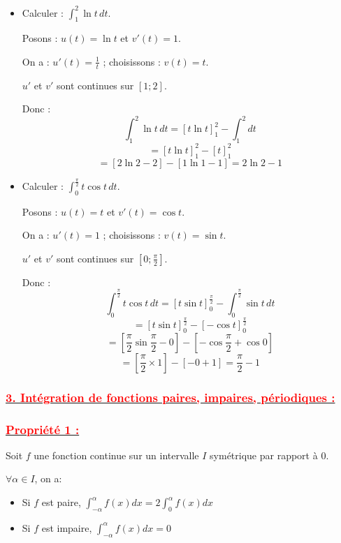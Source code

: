 \documentclass[12pt,a4paper]{article}
\begin{document}
\begin{itemize}
    \item Calculer : \( \int_1^2 \ln t \, dt \).
    
    Posons : \( u(t) = \ln t \) et \( v'(t) = 1 \).
    
    On a : \( u'(t) = \frac{1}{t} \) ; choisissons : \( v(t) = t \).
    
    \( u' \) et \( v' \) sont continues sur \( [1 ; 2] \).
    
    Donc :
    \[
    \int_1^2 \ln t \, dt = \left[ t \ln t \right]_1^2 - \int_1^2 dt
    \]
    \[
    = \left[ t \ln t \right]_1^2 - \left[ t \right]_1^2
    \]
    \[
    = \left[ 2 \ln 2 - 2 \right] - \left[ 1 \ln 1 - 1 \right] = 2 \ln 2 - 1
    \]
    
    \item Calculer : \( \int_0^{\frac{\pi}{2}} t \cos t \, dt \).
    
    Posons : \( u(t) = t \) et \( v'(t) = \cos t \).
    
    On a : \( u'(t) = 1 \) ; choisissons : \( v(t) = \sin t \).
    
    \( u' \) et \( v' \) sont continues sur \( [0 ; \frac{\pi}{2}] \).
    
    Donc :
    \[
    \int_0^{\frac{\pi}{2}} t \cos t \, dt = \left[ t \sin t \right]_0^{\frac{\pi}{2}} - \int_0^{\frac{\pi}{2}} \sin t \, dt
    \]
    \[
    = \left[ t \sin t \right]_0^{\frac{\pi}{2}} - \left[ - \cos t \right]_0^{\frac{\pi}{2}}
    \]
    \[
    = \left[ \frac{\pi}{2} \sin \frac{\pi}{2} - 0 \right] - \left[ - \cos \frac{\pi}{2} + \cos 0 \right]
    \]
    \[
    = \left[ \frac{\pi}{2} \times 1 \right] - \left[ - 0 + 1 \right] = \frac{\pi}{2} - 1
    \]
\end{itemize}

\subsubsection*{\underline{\textcolor{red}{3. Intégration de fonctions paires, impaires, périodiques :}}}
\subsubsection*{\underline{\textcolor{red}{Propriété 1 :}}}
Soit \(f\) une fonction continue sur un intervalle \(I\) symétrique par rapport à \(0\).

\( \forall \alpha \in I \), on a:

\begin{itemize}
    \item Si \(f\) est paire, \( \int_{-\alpha}^{\alpha}f(x)dx = 2 \int_{0}^{\alpha}f(x)dx \)
    \item Si \(f\) est impaire, \( \int_{-\alpha}^{\alpha}f(x)dx =  0 \)
\end{itemize}
\end{document}
